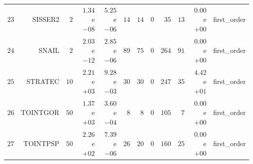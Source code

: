 \begin{longtable}{rrrrrrrrrrrr}
  \(    23\) & SISSER2 & \(     2\) & \( 1.34\)e\(-08\) & \( 5.25\)e\(-06\) & \(    14\) & \(    14\) & \(     0\) & \(    35\) & \(    13\) & \( 0.00\)e\(+00\) & first\_order \\
  \(    24\) & SNAIL & \(     2\) & \( 2.03\)e\(-12\) & \( 2.85\)e\(-06\) & \(    89\) & \(    75\) & \(     0\) & \(   264\) & \(    91\) & \( 0.00\)e\(+00\) & first\_order \\
  \(    25\) & STRATEC & \(    10\) & \( 2.21\)e\(+03\) & \( 9.28\)e\(-03\) & \(    30\) & \(    30\) & \(     0\) & \(   247\) & \(    35\) & \( 4.42\)e\(+01\) & first\_order \\
  \(    26\) & TOINTGOR & \(    50\) & \( 1.37\)e\(+03\) & \( 3.60\)e\(-04\) & \(     8\) & \(     8\) & \(     0\) & \(   105\) & \(     7\) & \( 0.00\)e\(+00\) & first\_order \\
  \(    27\) & TOINTPSP & \(    50\) & \( 2.26\)e\(+02\) & \( 7.39\)e\(-06\) & \(    26\) & \(    20\) & \(     0\) & \(   160\) & \(    25\) & \( 0.00\)e\(+00\) & first\_order \\\hline
\end{longtable}
